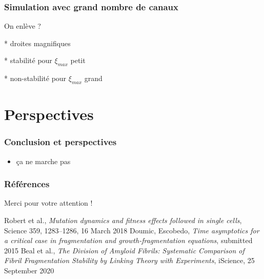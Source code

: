 \documentclass{beamer}
\begin{document}
\begin{frame}[allowframebreaks]
  \frametitle{Simulation avec grand nombre de canaux}
  On enlève ?
  
  * droites magnifiques

  * stabilité pour $\xi_{max}$ petit

  * non-stabilité pour $\xi_{max}$ grand
\end{frame}


\section*{Perspectives}

\begin{frame}
  \frametitle{Conclusion et perspectives}
  \begin{itemize}[label=$\bullet$]
    \item ça ne marche pas
  \end{itemize}
\end{frame}



\begin{frame}
  \frametitle{Références}

  \begin{center}
    \Large{Merci pour votre attention !}
  \end{center}
  
\begin{thebibliography}{1}

  Robert et al.,
  \emph{Mutation dynamics and fitness effects followed in single cells}, Science 359, 1283–1286, 16 March 2018
  Doumic, Escobedo,
  \emph{Time asymptotics for a critical case in fragmentation and growth-fragmentation equations}, submitted 2015
  Beal et al.,
  \emph{The Division of Amyloid Fibrils: Systematic Comparison of Fibril Fragmentation Stability by Linking Theory with Experiments}, iScience, 25 September 2020
\end{thebibliography}


\end{frame}
\end{document}

